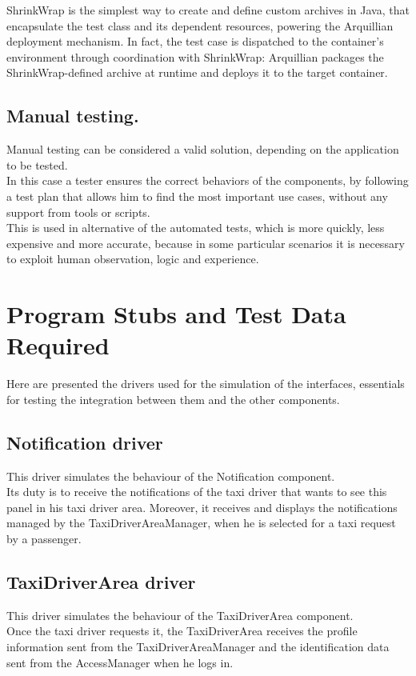 \documentclass[18pt,oneside,a4paper, titlepage]{article}
\begin{document}
			
		\vspace{0.5cm}
			
		ShrinkWrap is the simplest way to create and define custom archives in Java, that encapsulate the test class and its dependent resources, powering the Arquillian deployment mechanism. In fact, the test case is dispatched to the container's environment through coordination with ShrinkWrap: Arquillian packages the ShrinkWrap-defined archive at runtime and deploys it to the target container.
		
	\subsection{Manual testing.}
		Manual testing can be considered a valid solution, depending on the application to be tested.\\ In this case a tester ensures the correct behaviors of the components, by following a test plan that allows him to find the most important use cases, without any support from tools or scripts.\\ This is used in alternative of the automated tests, which is more quickly, less expensive and more accurate, because in some particular scenarios it is necessary to exploit human observation, logic and experience.

\newpage
\section{Program	Stubs	and	Test	Data	Required}
	Here are presented the drivers used for the simulation of the interfaces, essentials for testing the integration between them and the other components.
	\subsection{Notification driver}
		This driver simulates the behaviour of the Notification component.\\ Its duty is to receive the notifications of the taxi driver that wants to see this panel in his taxi driver area. Moreover, it receives and displays the notifications managed by the TaxiDriverAreaManager, when he is selected for a taxi request by a passenger.
	\subsection{TaxiDriverArea driver}
		This driver simulates the behaviour of the TaxiDriverArea component.\\ Once the taxi driver requests it, the TaxiDriverArea receives the profile information sent from the TaxiDriverAreaManager and the identification data sent from the AccessManager when he logs in.
\end{document}
